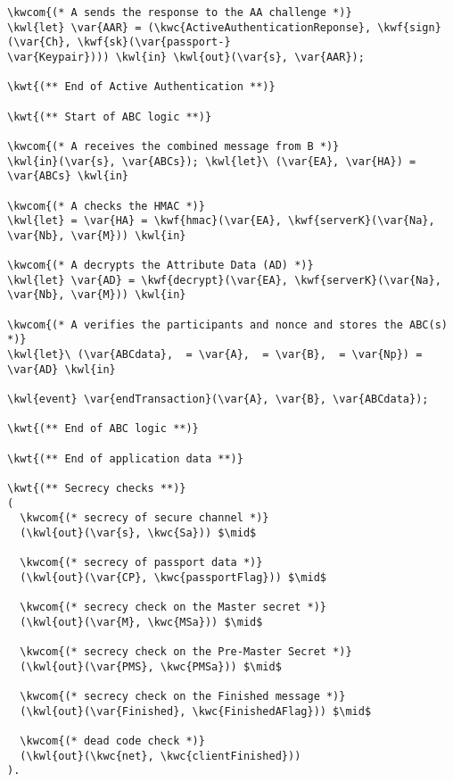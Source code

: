 \begin{Verbatim}[commandchars=\\\{\}, codes={\catcode`$=3}]
\kwcom{(* A sends the response to the AA challenge *)}
\kwl{let} \var{AAR} = (\kwc{ActiveAuthenticationReponse}, \kwf{sign}(\var{Ch}, \kwf{sk}(\var{passport-}
\var{Keypair}))) \kwl{in} \kwl{out}(\var{s}, \var{AAR});

\kwt{(** End of Active Authentication **)}

\kwt{(** Start of ABC logic **)}

\kwcom{(* A receives the combined message from B *)}
\kwl{in}(\var{s}, \var{ABCs}); \kwl{let}\ (\var{EA}, \var{HA}) = \var{ABCs} \kwl{in}

\kwcom{(* A checks the HMAC *)}
\kwl{let} = \var{HA} = \kwf{hmac}(\var{EA}, \kwf{serverK}(\var{Na}, \var{Nb}, \var{M})) \kwl{in}

\kwcom{(* A decrypts the Attribute Data (AD) *)}
\kwl{let} \var{AD} = \kwf{decrypt}(\var{EA}, \kwf{serverK}(\var{Na}, \var{Nb}, \var{M})) \kwl{in}

\kwcom{(* A verifies the participants and nonce and stores the ABC(s) *)}
\kwl{let}\ (\var{ABCdata},  = \var{A},  = \var{B},  = \var{Np}) = \var{AD} \kwl{in}

\kwl{event} \var{endTransaction}(\var{A}, \var{B}, \var{ABCdata});

\kwt{(** End of ABC logic **)}

\kwt{(** End of application data **)}

\kwt{(** Secrecy checks **)}
(
  \kwcom{(* secrecy of secure channel *)}
  (\kwl{out}(\var{s}, \kwc{Sa})) $\mid$
  
  \kwcom{(* secrecy of passport data *)}
  (\kwl{out}(\var{CP}, \kwc{passportFlag})) $\mid$
  
  \kwcom{(* secrecy check on the Master secret *)}
  (\kwl{out}(\var{M}, \kwc{MSa})) $\mid$
  
  \kwcom{(* secrecy check on the Pre-Master Secret *)}
  (\kwl{out}(\var{PMS}, \kwc{PMSa})) $\mid$
  
  \kwcom{(* secrecy check on the Finished message *)}
  (\kwl{out}(\var{Finished}, \kwc{FinishedAFlag})) $\mid$

  \kwcom{(* dead code check *)}
  (\kwl{out}(\kwc{net}, \kwc{clientFinished}))
).
\end{Verbatim}

